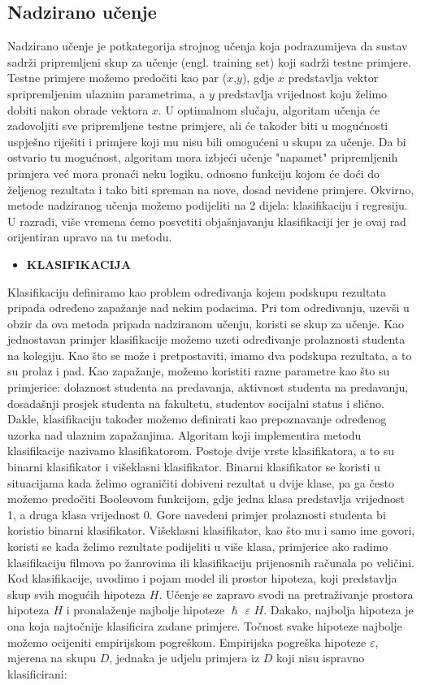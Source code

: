 \documentclass[times, utf8, zavrsni, numeric]{fer}
\begin{document}
\subsection{Nadzirano učenje}
Nadzirano učenje je potkategorija strojnog učenja koja podrazumijeva da sustav sadrži pripremljeni skup za učenje (engl. training set) koji sadrži testne primjere. Testne primjere možemo predočiti kao par ($x$,$y$), gdje $x$ predstavlja vektor spripremljenim ulaznim parametrima, a $y$ predstavlja vrijednost koju želimo dobiti nakon obrade vektora $x$. U optimalnom slučaju, algoritam učenja će zadovoljiti sve pripremljene testne primjere, ali će također biti u mogućnosti  uspješno riješiti i primjere koji mu nisu bili omogućeni u skupu za učenje. Da bi ostvario tu mogućnost, algoritam mora izbjeći učenje "napamet" pripremljenih primjera već mora pronaći neku logiku, odnosno funkciju kojom će doći do željenog rezultata i tako biti spreman na nove, dosad neviđene primjere. Okvirno, metode nadziranog učenja možemo podijeliti na 2 dijela: klasifikaciju i regresiju. U razradi, više vremena ćemo posvetiti objašnjavanju klasifikaciji jer je ovaj rad orijentiran upravo na tu metodu.\cite{super1}\cite{super2}
\let\labelitemi\labelitemii
\begin{itemize}
  \item \textbf{KLASIFIKACIJA}
\end{itemize}
Klasifikaciju definiramo kao problem određivanja kojem podskupu rezultata pripada određeno zapažanje nad nekim podacima. Pri tom određivanju, uzevši u obzir da ova metoda pripada nadziranom učenju, koristi se skup za učenje. Kao jednostavan primjer klasifikacije možemo uzeti određivanje prolaznosti studenta na kolegiju. Kao što se može i pretpostaviti, imamo dva podskupa rezultata, a to su prolaz i pad. Kao zapažanje, možemo koristiti razne parametre kao što su primjerice: dolaznost studenta na predavanja, aktivnost studenta na predavanju, dosadašnji prosjek studenta na fakultetu, studentov socijalni status i slično. Dakle, klasifikaciju također možemo definirati kao prepoznavanje određenog uzorka nad ulaznim zapažanjima. Algoritam koji implementira metodu klasifikacije nazivamo klasifikatorom. Postoje dvije vrste klasifikatora, a to su binarni klasifikator i višeklasni klasifikator. Binarni klasifikator se koristi u situacijama kada želimo ograničiti dobiveni rezultat u dvije klase, pa ga često možemo predočiti Booleovom funkcijom, gdje jedna klasa predstavlja vrijednost 1, a druga klasa vrijednost 0. Gore navedeni primjer prolaznosti studenta bi koristio binarni klasifikator. Višeklasni klasifikator, kao što mu i samo ime govori, koristi se kada želimo rezultate podijeliti u više klasa, primjerice ako radimo klasifikaciju filmova po žanrovima ili klasifikaciju prijenosnih računala po veličini. Kod klasifikacije, uvodimo i pojam model ili prostor hipoteza, koji predstavlja skup svih mogućih hipoteza $H$. Učenje se zapravo svodi na pretraživanje prostora hipoteza $H$ i pronalaženje najbolje hipoteze $\hslash$ $\varepsilon$ $H$. Dakako, najbolja hipoteza je ona koja najtočnije klasificira zadane primjere. Točnost svake hipoteze najbolje možemo ocijeniti empirijskom pogreškom. Empirijska pogreška hipoteze $\varepsilon$, mjerena na skupu $D$, jednaka je udjelu primjera iz $D$ koji nisu ispravno klasificirani:
\end{document}
